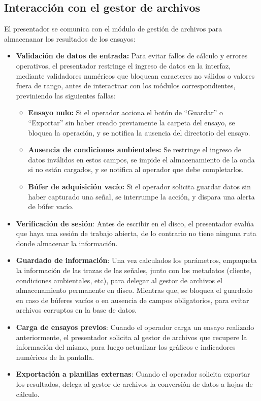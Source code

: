 \subsection{Interacción con el gestor de archivos}
El presentador se comunica con el módulo de gestión de archivos para almacenanar los resultados de los ensayos:
\begin{itemize}
        \item \textbf{Validación de datos de entrada:} Para evitar fallos de cálculo y errores operativos, el presentador restringe el ingreso de datos en la interfaz, mediante validadores numéricos que bloquean caracteres no válidos o valores fuera de rango, antes de interactuar con los módulos correspondientes, previniendo las siguientes fallas:
        \begin{itemize}
            \item \textbf{Ensayo nulo:} Si el operador acciona el botón de \enquote{Guardar} o \enquote{Exportar} sin haber creado previamente la carpeta del ensayo, se bloquea la operación, y se notifica la ausencia del directorio del ensayo.
            \item \textbf{Ausencia de condiciones ambientales:} Se restringe el ingreso de datos inválidos en estos campos, se impide el almacenamiento de la onda si no están cargados, y se notifica al operador que debe completarlos.
            \item \textbf{Búfer de adquisición vacío:} Si el operador solicita guardar datos sin haber capturado una señal, se interrumpe la acción, y dispara una alerta de búfer vacío.
        \end{itemize}
    \item \textbf{Verificación de sesión}: Antes de escribir en el disco, el presentador evalúa que haya una sesión de trabajo abierta, de lo contrario no tiene ninguna ruta donde almacenar la información.
    \item \textbf{Guardado de información}: Una vez calculados los parámetros, empaqueta la información de las trazas de las señales, junto con los metadatos (cliente, condiciones ambientales, etc), para delegar al gestor de archivos el almacenamiento permanente en disco. Mientras que, se bloquea el guardado en caso de búferes vacíos o en ausencia de campos obligatorios, para evitar archivos corruptos en la base de datos.
    \item \textbf{Carga de ensayos previos}: Cuando el operador carga un ensayo realizado anteriormente, el presentador solicita al gestor de archivos que recupere la información del mismo, para luego actualizar los gráficos e indicadores numéricos de la pantalla.
    \item \textbf{Exportación a planillas externas}: Cuando el operador solicita exportar los resultados, delega al gestor de archivos la conversión de datos a hojas de cálculo.
\end{itemize}